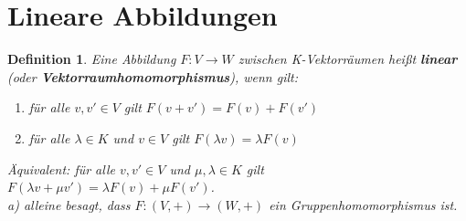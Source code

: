 \documentclass[12pt,a4paper]{article}
\theoremstyle{plain}
\newtheorem{Definition}[Theorem]{Definition}
\newcommand{\herv}[1]{{\emph{\textbf{#1}}}}
\numberwithin{equation}{section}
\begin{document}
\section{Lineare Abbildungen}
\begin{Definition}
Eine Abbildung $F: V \rightarrow W$ zwischen K-Vektorräumen heißt \herv{linear} (oder \herv{Vektorraumhomomorphismus}), wenn gilt:
\begin{enumerate}
\renewcommand{\labelenumi}{\emph{(\alph{enumi})}}
\item für alle $v,v'\in V$ gilt $F(v+v')=F(v)+F(v')$
\item für alle $\lambda \in K$ und $v\in V$ gilt $F(\lambda v)=\lambda F(v)$
\end{enumerate}
Äquivalent: für alle $v,v' \in V$ und $\mu, \lambda\in K$ gilt $F(\lambda v+ \mu v')=\lambda F(v)+\mu F(v')$.\\
\emph{a)} alleine besagt, dass $F: (V,+)\rightarrow (W,+)$ ein Gruppenhomomorphismus ist.
\end{Definition}
\end{document}
